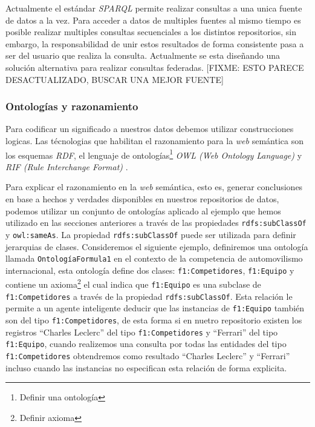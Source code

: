 Actualmente el estándar \textit{SPARQL} permite realizar consultas a una unica
fuente de datos a la vez. Para acceder a datos de multiples fuentes al mismo
tiempo es posible realizar multiples consultas secuenciales a los distintos
repositorios, sin embargo, la responsabilidad de unir estos resultados de forma
consistente pasa a ser del usuario que realiza la consulta. Actualmente se esta
diseñando una solución alternativa para realizar consultas federadas. [FIXME:
ESTO PARECE DESACTUALIZADO, BUSCAR UNA MEJOR FUENTE]

\subsubsection{Ontologías y razonamiento}

Para codificar un significado a nuestros datos debemos utilizar construcciones
logicas. Las técnologias que habilitan el razonamiento para la \textit{web}
semántica son los esquemas \textit{RDF}, el lenguaje de
ontologías\footnote{Definir una ontología} \textit{OWL (Web Ontology Language)}
\cite{antoniou2004web} y \textit{RIF (Rule Interchange Format)}
\cite{kifer2008rule}.

Para explicar el razonamiento en la \textit{web} semántica, esto es, generar
conclusiones en base a hechos y verdades disponibles en nuestros repositorios de
datos, podemos utilizar un conjunto de ontologías aplicado al ejemplo que hemos
utilizado en las secciones anteriores a través de las propiedades
\texttt{rdfs:subClassOf} y \texttt{owl:sameAs}. La propiedad
\texttt{rdfs:subClassOf} puede ser utilizada para definir jerarquias de clases.
Consideremos el siguiente ejemplo, definiremos una ontología llamada
\texttt{OntologíaFormula1} en el contexto de la competencia de automovilismo
internacional, esta ontología define dos clases: \texttt{f1:Competidores},
\texttt{f1:Equipo} y contiene un axioma\footnote{Definir axioma} el cual indica
que \texttt{f1:Equipo} es una subclase de \texttt{f1:Competidores} a través de
la propiedad \texttt{rdfs:subClassOf}. Esta relación le permite a un agente
inteligente deducir que las instancias de \texttt{f1:Equipo} también son del
tipo \texttt{f1:Competidores}, de esta forma si en nuetro repositorio existen
los registros ``Charles Leclerc'' del tipo \texttt{f1:Competidores} y
``Ferrari'' del tipo \texttt{f1:Equipo}, cuando realizemos una consulta por
todas las entidades del tipo \texttt{f1:Competidores} obtendremos como resultado
``Charles Leclerc'' y ``Ferrari'' incluso cuando las instancias no especifican
esta relación de forma explicita.

